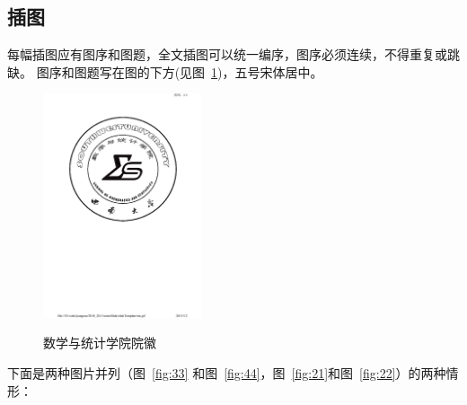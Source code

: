 		\subsection{插图}
		每幅插图应有图序和图题，全文插图可以统一编序，图序必须连续，不得重复或跳缺。
		图序和图题写在图的下方(见图~\ref{fig:1})，五号宋体居中。
		\begin{figure}
			\centering
			\includegraphics[height=6.6cm,angle=0]{preample/ms}\\
			\caption{数学与统计学院院徽}\label{fig:1}
		\end{figure}
		下面是两种图片并列（图~\ref{fig:33} 和图~\ref{fig:44}，图~\ref{fig:21}和图~\ref{fig:22}）的两种情形：
